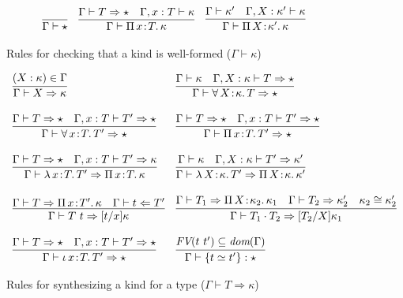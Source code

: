 \documentclass{article}
\newcommand{\abs}[4]{{#1}\, #2\! : \! #3.\, #4}
\newcommand{\tpcheck}[0]{\Leftarrow}
\newcommand{\tpsynth}[0]{\Rightarrow}
\begin{document}
\begin{figure}
  \[
  \begin{array}{llll}
    \infer{\Gamma \vdash \star}{\ } &
    \infer{\Gamma\vdash\abs{\Pi}{x}{T}{\kappa}}{\Gamma \vdash T \tpsynth \star & \Gamma,x:T\vdash\kappa} &
    \infer{\Gamma\vdash\abs{\Pi}{X}{\kappa'}{\kappa}}{\Gamma \vdash \kappa' & \Gamma,X:\kappa'\vdash\kappa}
  \end{array}
  \]
  \caption{Rules for checking that a kind is well-formed ($\Gamma \vdash \kappa$)}
  \label{fig:superknd}
\end{figure}

\begin{figure}
  \[
  \begin{array}{ll}
    \infer{\Gamma \vdash X \tpsynth \kappa}{(X : \kappa) \in \Gamma} &
    \infer{\Gamma\vdash \abs{\forall}{X}{\kappa}{T} \tpsynth \star}{\Gamma \vdash \kappa & \Gamma,X:\kappa\vdash T \tpsynth \star} \\ \\
    \infer{\Gamma\vdash\abs{\forall}{x}{T}{T'} \tpsynth \star}{\Gamma \vdash T \tpsynth \star & \Gamma,x:T\vdash T' \tpsynth \star} &
    \infer{\Gamma\vdash\abs{\Pi}{x}{T}{T'} \tpsynth \star}{\Gamma \vdash T \tpsynth \star & \Gamma,x:T\vdash T' \tpsynth \star} \\ \\
    \infer{\Gamma\vdash\abs{\lambda}{x}{T}{T'} \tpsynth \abs{\Pi}{x}{T}{\kappa}}{\Gamma \vdash T \tpsynth \star & \Gamma,x:T\vdash T'\tpsynth\kappa} &
    \infer{\Gamma\vdash\abs{\lambda}{X}{\kappa}{T'} \tpsynth \abs{\Pi}{X}{\kappa}{\kappa'}}{\Gamma \vdash \kappa & \Gamma,X:\kappa\vdash T'\tpsynth\kappa'} \\ \\
    \infer{\Gamma\vdash T\ t \tpsynth [t/x]\kappa}{\Gamma\vdash T \tpsynth \abs{\Pi}{x}{T'}{\kappa} & \Gamma\vdash t \tpcheck T'} &
    \infer{\Gamma\vdash T_1 \cdot T_2 \tpsynth [T_2/X]\kappa_1}{\Gamma\vdash T_1 \tpsynth \abs{\Pi}{X}{\kappa_2}{\kappa_1} & \Gamma\vdash T_2 \tpsynth \kappa_2' & \kappa_2 \cong \kappa_2'} \\ \\
    \infer{\Gamma\vdash\abs{\iota}{x}{T}{T'} \tpsynth \star}{\Gamma \vdash T \tpsynth \star & \Gamma,x:T\vdash T' \tpsynth \star} &
    \infer{\Gamma\vdash \{ t \simeq t' \} : \star}{\textit{FV}(t\ t')\subseteq\textit{dom}(\Gamma)}
  \end{array}
  \]
  \caption{Rules for synthesizing a kind for a type ($\Gamma \vdash T \tpsynth \kappa$)}
  \label{fig:knd}
\end{figure}
\end{document}
